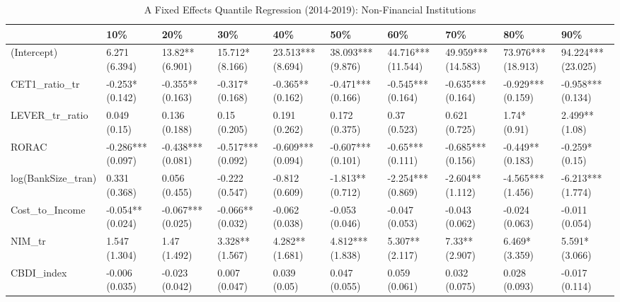 \begin{table}[ht]
\centering
\caption{A Fixed Effects Quantile Regression (2014-2019): Non-Financial Institutions} 
\begingroup\small
\begin{tabular}{llllllllll}
  \toprule
 & 10\% & 20\% & 30\% & 40\% & 50\% & 60\% & 70\% & 80\% & 90\% \\ 
  \midrule
(Intercept) & 6.271 (6.394) & 13.82** (6.901) & 15.712* (8.166) & 23.513*** (8.694) & 38.093*** (9.876) & 44.716*** (11.544) & 49.959*** (14.583) & 73.976*** (18.913) & 94.224*** (23.025) \\ 
  CET1\_ratio\_tr & -0.253* (0.142) & -0.355** (0.163) & -0.317* (0.168) & -0.365** (0.162) & -0.471*** (0.166) & -0.545*** (0.164) & -0.635*** (0.164) & -0.929*** (0.159) & -0.958*** (0.134) \\ 
  LEVER\_tr\_ratio & 0.049 (0.15) & 0.136 (0.188) & 0.15 (0.205) & 0.191 (0.262) & 0.172 (0.375) & 0.37 (0.523) & 0.621 (0.725) & 1.74* (0.91) & 2.499** (1.08) \\ 
  RORAC & -0.286*** (0.097) & -0.438*** (0.081) & -0.517*** (0.092) & -0.609*** (0.094) & -0.607*** (0.101) & -0.65*** (0.111) & -0.685*** (0.156) & -0.449** (0.183) & -0.259* (0.15) \\ 
  log(BankSize\_tran) & 0.331 (0.368) & 0.056 (0.455) & -0.222 (0.547) & -0.812 (0.609) & -1.813** (0.712) & -2.254*** (0.869) & -2.604** (1.112) & -4.565*** (1.456) & -6.213*** (1.774) \\ 
  Cost\_to\_Income & -0.054** (0.024) & -0.067*** (0.025) & -0.066** (0.032) & -0.062 (0.038) & -0.053 (0.046) & -0.047 (0.053) & -0.043 (0.062) & -0.024 (0.063) & -0.011 (0.054) \\ 
  NIM\_tr & 1.547 (1.304) & 1.47 (1.492) & 3.328** (1.567) & 4.282** (1.681) & 4.812*** (1.838) & 5.307** (2.117) & 7.33** (2.907) & 6.469* (3.359) & 5.591* (3.066) \\ 
  CBDI\_index & -0.006 (0.035) & -0.023 (0.042) & 0.007 (0.047) & 0.039 (0.05) & 0.047 (0.055) & 0.059 (0.061) & 0.032 (0.075) & 0.028 (0.093) & -0.017 (0.114) \\ 
   \bottomrule
\end{tabular}
\endgroup
\end{table}
